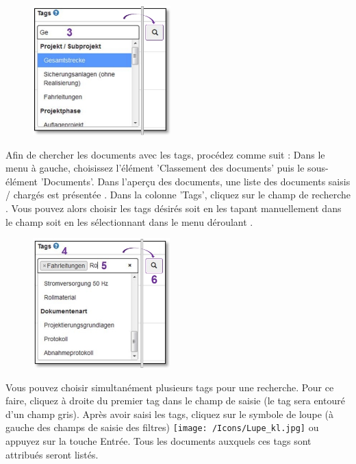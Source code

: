 \pagebreak

\begin{figure}
\vspace{-10pt}
\includegraphics[height=50mm]{../chapters/11_Dokumentenablage/pictures/11-2-8_DokTagHinzufuegen.jpg}
\end{figure}
Afin de chercher les documents avec les tags, procédez comme suit : 
Dans le menu à gauche, choisissez l'élément 'Classement des documents' puis le sous-élément 'Documents'. Dans l'aperçu des documents, une liste des documents saisis / chargés est présentée . Dans la colonne 'Tags', cliquez sur le champ de recherche . Vous pouvez alors choisir les tags désirés soit en les tapant manuellement dans le champ soit en les sélectionnant dans le menu déroulant .

\vspace{\baselineskip}

\begin{figure}
\vspace{-30pt}
\includegraphics[height=50mm]{../chapters/11_Dokumentenablage/pictures/11-2-8_TagEingabe.jpg}
\end{figure}
Vous pouvez choisir simultanément plusieurs tags pour une recherche. Pour ce faire, cliquez à droite du premier tag  dans le champ de saisie  (le tag sera entouré d'un champ gris). Après avoir saisi les tags, cliquez sur le symbole de loupe (à gauche des champs de saisie des filtres) \texttt{[image: /Icons/Lupe\_kl.jpg]}  ou appuyez sur la touche Entrée. Tous les documents auxquels ces tags sont attribués seront listés.

